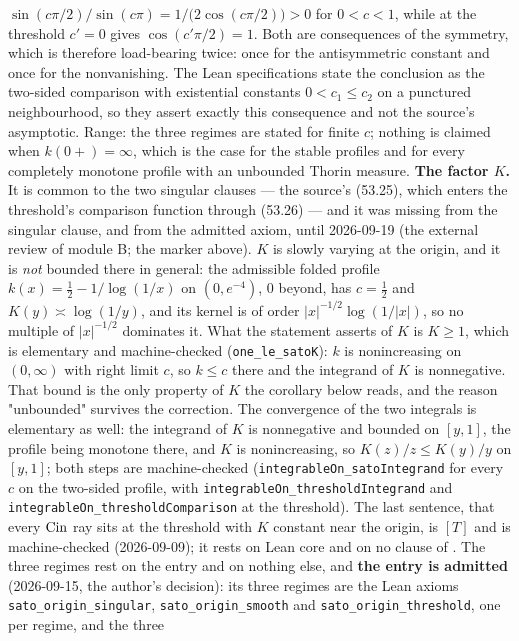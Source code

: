 \begin{proposition}
{$\sin(c\pi/2)/\sin(c\pi) = 1/\bigl(2\cos(c\pi/2)\bigr) > 0$ for $0 < c < 1$, while at the
threshold $c' = 0$ gives $\cos(c'\pi/2) = 1$. Both are consequences of the symmetry, which is
therefore load-bearing twice: once for the antisymmetric constant and once for the nonvanishing.
The Lean specifications state the conclusion as the two-sided comparison with existential
constants $0 < c_1 \le c_2$ on a punctured neighbourhood, so they assert exactly this
consequence and not the source's asymptotic.
Range: the three regimes are stated for finite $c$; nothing is
claimed when $k(0{+}) = \infty$, which is the case for the stable profiles and for every
completely monotone profile with an unbounded Thorin measure.
\textbf{The factor $K$.} It is common to the two singular clauses --- the source's (53.25), which
enters the threshold's comparison function through (53.26) --- and it was missing from the singular
clause, and from the admitted axiom, until 2026-09-19 (the external review of module B; the marker
above). $K$ is slowly varying at the origin, and it is \emph{not} bounded there in general: the
admissible folded profile $k(x) = \tfrac12 - 1/\log(1/x)$ on $(0,e^{-4})$, $0$ beyond, has
$c = \tfrac12$ and $K(y) \asymp \log(1/y)$, and its kernel is of order $|x|^{-1/2}\log(1/|x|)$, so
no multiple of $|x|^{-1/2}$ dominates it. What the statement asserts of $K$ is $K \ge 1$, which is
elementary and machine-checked (\texttt{one\_le\_satoK}): $k$ is nonincreasing on $(0,\infty)$ with
right limit $c$, so $k \le c$ there and the integrand of $K$ is nonnegative. That bound is the only
property of $K$ the corollary below reads, and the reason "unbounded" survives the correction. The
convergence of the two integrals is elementary as well: the integrand of $K$ is nonnegative and
bounded on $[y,1]$, the profile being monotone there, and $K$ is nonincreasing, so
$K(z)/z \le K(y)/y$ on $[y,1]$; both steps
are machine-checked (\texttt{integrableOn\_satoIntegrand} for every $c$ on the two-sided profile,
with \texttt{integrableOn\_thresholdIntegrand} and \texttt{integrableOn\_thresholdComparison} at
the threshold). The last sentence, that every
$\operatorname{Cin}$ ray sits at the threshold with $K$ constant near the origin, is $[T]$ and is
machine-checked (2026-09-09); it rests on Lean core and on no clause of . The three
regimes rest on the entry and on nothing else, and \textbf{the entry is admitted} (2026-09-15,
the author's decision): its three regimes are the Lean axioms \texttt{sato\_origin\_singular},
\texttt{sato\_origin\_smooth} and \texttt{sato\_origin\_threshold}, one per regime, and the three
}
\end{proposition}
